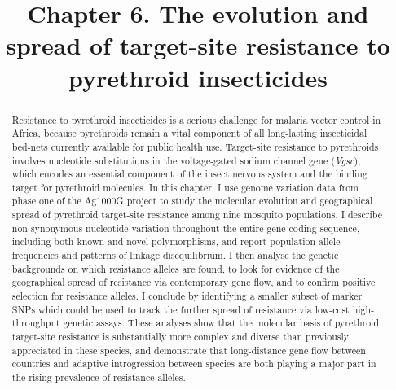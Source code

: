 \documentclass[a4paper,11pt,abstracton,hidelinks]{scrartcl}
\title{
Chapter 6. The evolution and spread of target-site resistance to pyrethroid insecticides
}
\author{}
\begin{document}
\renewcommand{\abstractname}{Summary}


\maketitle


\begin{abstract}


Resistance to pyrethroid insecticides is a serious challenge for malaria vector control in Africa, because pyrethroids remain a vital component of all long-lasting insecticidal bed-nets currently available for public health use.
%
Target-site resistance to pyrethroids involves nucleotide substitutions in the voltage-gated sodium channel gene (\textit{Vgsc}), which encodes an essential component of the insect nervous system and the binding target for pyrethroid molecules.
%
In this chapter, I use genome variation data from phase one of the Ag1000G project to study the molecular evolution and geographical spread of pyrethroid target-site resistance among nine mosquito populations.
%
I describe non-synonymous nucleotide variation throughout the entire gene coding sequence, including both known and novel polymorphisms, and report population allele frequencies and patterns of linkage disequilibrium.
%
I then analyse the genetic backgrounds on which resistance alleles are found, to look for evidence of the geographical spread of resistance via contemporary gene flow, and to confirm positive selection for resistance alleles.
%
I conclude by identifying a smaller subset of marker SNPs which could be used to track the further spread of resistance via low-cost high-throughput genetic assays.
%
These analyses show that the molecular basis of pyrethroid target-site resistance is substantially more complex and diverse than previously appreciated in these species, and demonstrate that long-distance gene flow between countries and adaptive introgression between species are both playing a major part in the rising prevalence of resistance alleles.


\end{abstract}


\tableofcontents


\end{document}
